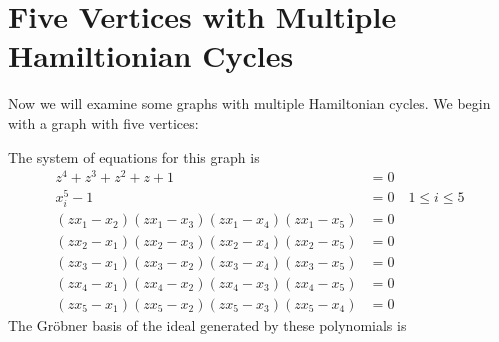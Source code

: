 \documentclass[letterpaper]{article}
\newcommand{\aln}[1]{\begin{align*} #1 \end{align*}} %
\begin{document}
\section{Five Vertices with Multiple Hamiltionian Cycles}
Now we will examine some graphs with multiple Hamiltonian cycles. We begin with a graph with five vertices:
\begin{center}
\end{center}
The system of equations for this graph is
\aln{
  z^4 + z^3 + z^2 + z + 1 &= 0\\
  x_i^5 - 1 &= 0 \quad 1 \leq i \leq 5\\
  (z x_1 - x_2) (z x_1 - x_3) (z x_1 - x_4) (z x_1 - x_5) &= 0\\
  (z x_2 - x_1) (z x_2 - x_3) (z x_2 - x_4) (z x_2 - x_5) &= 0\\
  (z x_3 - x_1) (z x_3 - x_2) (z x_3 - x_4) (z x_3 - x_5) &= 0\\
  (z x_4 - x_1) (z x_4 - x_2) (z x_4 - x_3) (z x_4 - x_5) &= 0\\
  (z x_5 - x_1) (z x_5 - x_2) (z x_5 - x_3) (z x_5 - x_4) &= 0
}
The Gr\"obner basis of the ideal generated by these polynomials is

\newpage
\end{document}
